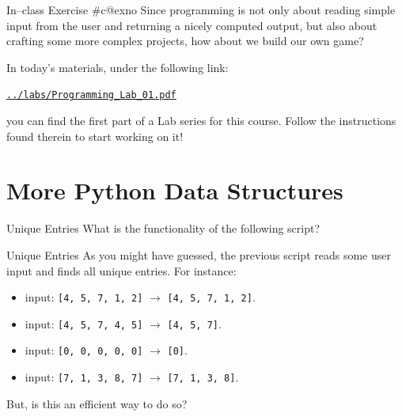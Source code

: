 \documentclass[aspectratio=169, 12pt, xcolor=table]{beamer}
\makeatletter
\newcommand{\ohref}[1]{\href{#1}{\texttt{#1}}}
\newcommand{\arabicthree}[1]{\expandafter\@arabicthree\csname c@#1\endcsname}
\newcommand{\@arabicthree}[1]{\ifnum #1<100 0\fi\ifnum #1<10 0\fi\number#1}
\newcounter{exno}
\newcommand{\exno}{\stepcounter{exno}In--class Exercise \#\arabicthree{exno}}
\makeatother
\begin{document}
	\begin{frame}{\exno}
		Since programming is not only about reading simple input from the user and returning a nicely computed output, but also about crafting some more complex projects, how about we build our own game?
		
		In today's materials, under the following link:
		\begin{center}
			\ohref{../labs/Programming\_Lab\_01.pdf}
		\end{center}
		you can find the first part of a Lab series for this course. Follow the instructions found therein to start working on it!
	\end{frame}

	\section{More Python Data Structures}\label{sec:more-python-data-structures}
	
	\sectionframe
	
	\begin{frame}{Unique Entries}
		What is the functionality of the following script?
		
	\end{frame}
	
	\begin{frame}{Unique Entries}
		As you might have guessed, the previous script reads some user input and finds all unique entries. For instance:
		\begin{itemize}
			\item input: \texttt{[4, 5, 7, 1, 2]} $\rightarrow$ \texttt{[4, 5, 7, 1, 2]}.
			\item input: \texttt{[4, 5, 7, 4, 5]} $\rightarrow$ \texttt{[4, 5, 7]}.
			\item input: \texttt{[0, 0, 0, 0, 0]} $\rightarrow$ \texttt{[0]}.
			\item input: \texttt{[7, 1, 3, 8, 7]} $\rightarrow$ \texttt{[7, 1, 3, 8]}.
		\end{itemize}
		But, is this an efficient way to do so?
	\end{frame}
\end{document}
